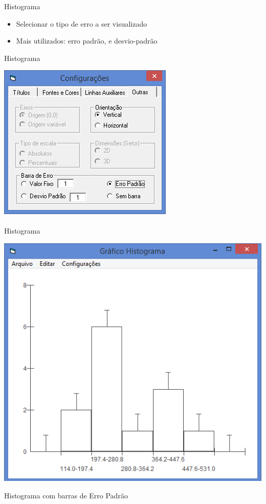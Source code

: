 \documentclass{beamer}
\begin{document}
\begin{frame}{Histograma}
  \begin{itemize}
  \item Selecionar o tipo de erro a ser visualizado
  \item Mais utilizados: erro padrão, e desvio-padrão
  \end{itemize}
\end{frame}

\begin{frame}{Histograma}
  \begin{center}
    \includegraphics[height=0.9\textheight]{Pratica_Desc/histograma5}
  \end{center}
\end{frame}

\begin{frame}{Histograma}
  \begin{center}
    \includegraphics[height=0.7\textheight]{Pratica_Desc/histograma6}
  \end{center}

  Histograma com barras de Erro Padrão
\end{frame}
\end{document}
